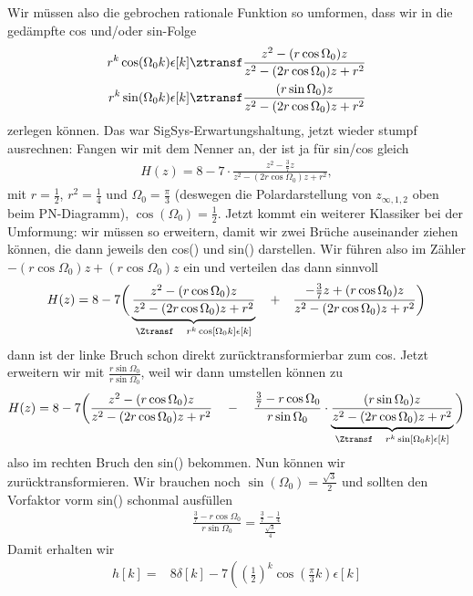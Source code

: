 \begin{Loesung}
Wir müssen also die gebrochen rationale Funktion so umformen, dass wir in
die gedämpfte cos und/oder sin-Folge
\begin{align}
r^k \cos(\Omega_0 k)\epsilon[k] \ztransf \frac{z^2 -(r\cos\Omega_0)z}{z^2 -(2r\cos\Omega_0)z + r^2}\\
r^k \sin(\Omega_0 k)\epsilon[k] \ztransf \frac{(r\sin\Omega_0)z}{z^2 -(2r\cos\Omega_0)z + r^2}
\end{align}
zerlegen können. Das war SigSys-Erwartungshaltung, jetzt wieder stumpf ausrechnen:
Fangen wir mit dem Nenner an, der ist ja für sin/cos gleich
\begin{align}
H(z) = 8 - 7\cdot\frac{z^2-\frac{3}{7}z}{z^2-(2r\cos\Omega_0)z +r^2},
\end{align}
mit $r = \frac{1}{2}$, $r^2=\frac{1}{4}$ und $\Omega_0 = \frac{\pi}{3}$ (deswegen
die Polardarstellung von $z_{\infty,1,2}$ oben beim PN-Diagramm),
$\cos(\Omega_0)=\frac{1}{2}$.
%
Jetzt kommt ein weiterer Klassiker bei der Umformung: wir müssen so erweitern,
damit wir zwei Brüche auseinander ziehen können, die dann jeweils den cos() und sin()
darstellen. Wir führen also im Zähler $-(r\cos\Omega_0)z + (r\cos\Omega_0)z$
ein und verteilen das dann sinnvoll
\begin{align}
H(z) = 8 -7\bigg(\underbrace{\frac{z^2-(r\cos\Omega_0)z}{z^2-(2r\cos\Omega_0)z +r^2}}_{\Ztransf \quad r^k \cos[\Omega_0 k]\epsilon[k]}
\quad + \quad \frac{-\frac{3}{7}z+(r\cos\Omega_0)z}{z^2-(2r\cos\Omega_0)z +r^2}\bigg)
\end{align}
dann ist der linke Bruch schon direkt zurücktransformierbar zum cos.
Jetzt erweitern wir mit $\frac{r\sin\Omega_0}{r\sin\Omega_0}$, weil wir dann
umstellen können zu
\begin{align}
H(z) = 8 -7\bigg(\frac{z^2-(r\cos\Omega_0)z}{z^2-(2r\cos\Omega_0)z +r^2}
\quad -\quad  \frac{\frac{3}{7}-r\cos\Omega_0}{r\sin\Omega_0}
\cdot \underbrace{\frac{(r\sin\Omega_0)z}{z^2-(2r\cos\Omega_0)z +r^2}}_{\Ztransf \quad r^k \sin[\Omega_0 k]\epsilon[k]}\bigg)
\end{align}
also im rechten Bruch den sin() bekommen.
Nun können wir zurücktransformieren. Wir brauchen noch $\sin(\Omega_0) = \frac{\sqrt{3}}{2}$
und sollten den Vorfaktor vorm sin() schonmal ausfüllen
\begin{align}
\frac{\frac{3}{7}-r\cos\Omega_0}{r\sin\Omega_0} = \frac{\frac{3}{7}-\frac{1}{4}}{\frac{\sqrt{3}}{4}}
\end{align}
Damit erhalten wir
\begin{align*}
h[k] =& 8\delta[k] -7\left(
\left(\frac{1}{2}\right)^k \cos(\frac{\pi}{3} k) \epsilon[k]

\end{align*}
\end{Loesung}
